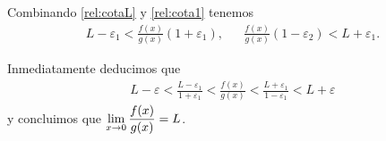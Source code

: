 {\begin{enumerate}[a)]
			Combinando \eqref{rel:cotaL} y \eqref{rel:cota1} tenemos
			\begin{align*}
				L-\varepsilon_1 < \frac{f(x)}{g(x)} (1+\varepsilon_1) 
				, &&
				\frac{f(x)}{g(x)} (1-\varepsilon_2) < L+\varepsilon_1
				.
			\end{align*}

			Inmediatamente deducimos que
			\begin{align*}
				L-\varepsilon < \frac{L-\varepsilon_1}{1+\varepsilon_1}
				< \frac{f(x)}{g(x)} <
				\frac{L+\varepsilon_1}{1-\varepsilon_1} < L+\varepsilon
			\end{align*}
			y concluimos que $\limite{x}[0]{\frac{f(x)}{g(x)}} = L$.

	\end{enumerate}
}
